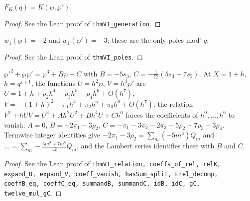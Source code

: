 \begin{theorem}
\label{thm:VI-generation}
\leanok
$F_K(q)=K(\wp,\wp')$.
\end{theorem}
\begin{proof}
\leanok
See the Lean proof of \texttt{thmVI\_generation}.
\end{proof}

\begin{theorem}
\label{thm:VI-poles}
\leanok
$w_1(\wp)=-2$ and $w_1(\wp')=-3$; these are the only poles mod$^\times q$.
\end{theorem}
\begin{proof}
\leanok
See the Lean proof of \texttt{thmVI\_poles}.
\end{proof}

\begin{theorem}
\label{thm:VI-relation}
\leanok
$\wp'^2+\wp\wp'=\wp^3+B\wp+C$ with $B=-5s_3$, $C=-\frac1{12}(5s_3+7s_5)$. At $X=1+h$, $h=q^{j+1}$, the functions $U=h^2\wp$, $V=h^3\wp'$ are $U=1+h+\rho_2h^4+\rho_3h^5+\rho_4h^6+O(h^7)$, $V=-(1+h)^2+\pi_1h^4+\pi_2h^5+\pi_3h^6+O(h^7)$; the relation $V^2+hUV=U^3+Ah^2U^2+Bh^4U+Ch^6$ forces the coefficients of $h^0,\dots,h^6$ to vanish: $A=0$, $B=-2\pi_1-3\rho_2$, $C=-\pi_1-3\pi_2-2\pi_3-5\rho_2-7\rho_3-3\rho_4$. Termwise integer identities give $-2\pi_1-3\rho_2=\sum_m(-5m^3)Q_m$ and $\dots=\sum_m-\frac{5m^3+7m^5}{12}Q_m$, and the Lambert series identifies these with $B$ and $C$.
\end{theorem}
\begin{proof}
\leanok
See the Lean proof of \texttt{thmVI\_relation, coeffs\_of\_rel, relK, expand\_U, expand\_V, coeff\_vanish, hasSum\_split, Erel\_decomp, coeffB\_eq, coeffC\_eq, summandB, summandC, idB, idC, gC, twelve\_mul\_gC}.
\end{proof}

